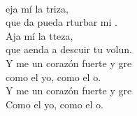\begin{cancion}%
	     \\
	eja  mí la triza,\\
	que da pueda rturbar mi .\\
	Aja  mí la tteza,\\
	que aenda a descuir tu volun.\\
	Y me un corazón fuerte y gre\\
	como el yo, como el o.\\
	Y me un corazón fuerte y gre\\
	Como el yo, como el o.\\
\end{cancion}%
